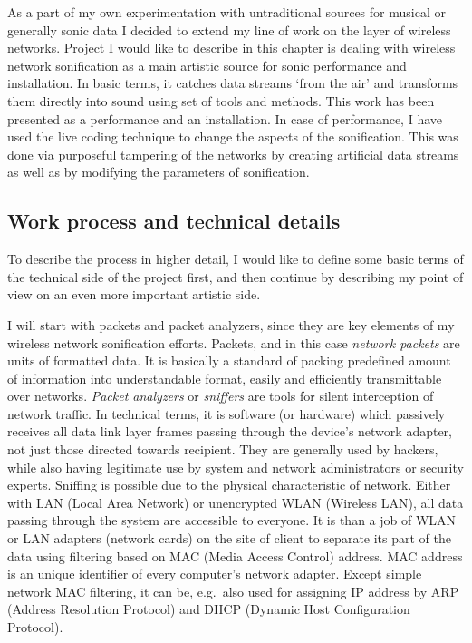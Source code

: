 \documentclass[12pt,a4paper,oneside]{report}
\begin{document}
As a part of my own experimentation with untraditional sources for musical or generally sonic data I decided to extend my line of work on the layer of wireless networks. Project I would like to describe in this chapter is dealing with wireless network sonification as a main artistic source for sonic performance and installation. In basic terms, it catches data streams `from the air' and transforms them directly into sound using set of tools and methods. This work has been presented as a performance and an installation. In case of performance, I have used the live coding technique to change the aspects of the sonification. This was done via purposeful tampering of the networks by creating artificial data streams as well as by modifying the parameters of sonification.

\subsection{Work process and technical details}

To describe the process in higher detail, I would like to define some basic terms of the technical side of the project first, and then continue by describing my point of view on an even more important artistic side.

I will start with packets and packet analyzers, since they are key elements of my wireless network sonification efforts. Packets, and in this case \emph{network packets} are units of formatted data. It is basically a standard of packing predefined amount of information into understandable format, easily and efficiently transmittable over networks. \emph{Packet analyzers} or \emph{sniffers} are tools for silent interception of network traffic. In technical terms, it is software (or hardware) which passively receives all data link layer frames passing through the device’s network adapter, not just those directed towards recipient. They are generally used by hackers, while also having legitimate use by system and network administrators or security experts. Sniffing is possible due to the physical characteristic of network. Either with LAN (Local Area Network) or unencrypted WLAN (Wireless LAN), all data passing through the system are accessible to everyone. It is than a job of WLAN or LAN adapters (network cards) on the site of client to separate its part of the data using filtering based on MAC (Media Access Control) address. MAC address is an unique identifier of every computer's network adapter. Except simple network MAC filtering, it can be, e.g.\, also used for assigning IP address by ARP (Address Resolution Protocol) and DHCP (Dynamic Host Configuration Protocol).
\end{document}
